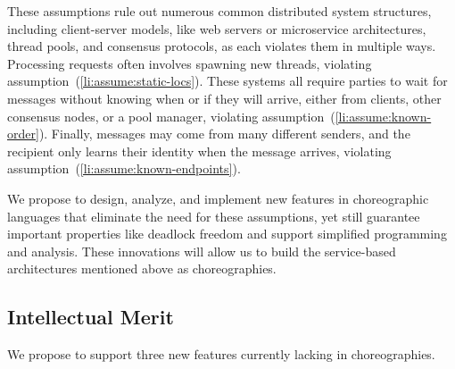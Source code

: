 These assumptions rule out numerous common distributed system structures,
including client-server models, like web servers or microservice architectures, thread pools, and consensus protocols, as each violates them in multiple ways.
Processing requests often involves spawning new threads, violating assumption~(\ref{li:assume:static-locs}).
These systems all require parties to wait for messages without knowing when or if they will arrive,
either from clients, other consensus nodes, or a pool manager, violating assumption~(\ref{li:assume:known-order}).
Finally, messages may come from many different senders, and the recipient only learns their identity when the message arrives,
violating assumption~(\ref{li:assume:known-endpoints}).

We propose to design, analyze, and implement new features in choreographic languages that eliminate the need for these assumptions,
yet still guarantee important properties like deadlock freedom and support simplified programming and analysis.
These innovations will allow us to build the service-based architectures mentioned above as choreographies.

\subsection{Intellectual Merit}
We propose to support three new features currently lacking in choreographies.

